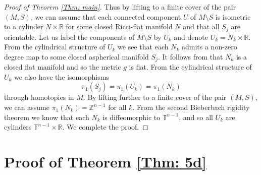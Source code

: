 \documentclass[11pt, reqno]{amsart}
\numberwithin{equation}{section}
\theoremstyle{definition}
\begin{document}
\begin{proof}[Proof of Theorem \ref{Thm: main}]
Thus by lifting to a finite cover of the pair $(M,S)$, we can assume that each connected component $U$ of $M\setminus S$ is isometric to a cylinder $N\times \mathbb R$ for some closed Ricci-flat manifold $N$ and that all $S_j$ are orientable. Let us label the components of $M\setminus S$ by $U_k$ and denote $U_k=N_k\times \mathbb R$. From the cylindrical structure of $U_k$ we see that each $N_k$ admits a non-zero degree map to some closed aspherical manifold $S_j$. It follows from \cite[Proposition 4.4]{CCZ23} that $N_k$ is a closed flat manifold and so the metric $g$ is flat. From the cylindrical structure of $U_k$ we also have the isomorphisms
$$\pi_1(S_j)=\pi_1(U_k)=\pi_1(N_k)$$
through homotopies in $M$. By lifting further to a finite cover of the pair $(M,S)$, we can assume $\pi_1(N_k)=\mathbb Z^{n-1}$ for all $k$. From the second Bieberbach rigidity theorem we know that each $N_k$ is diffeomorphic to $\mathbb T^{n-1}$, and so all $U_k$ are cylinders $\mathbb T^{n-1}\times \mathbb R$. We complete the proof.
\end{proof}



\section{Proof of Theorem \ref{Thm: 5d}}\label{Sec: proof of 5d}
\end{document}
